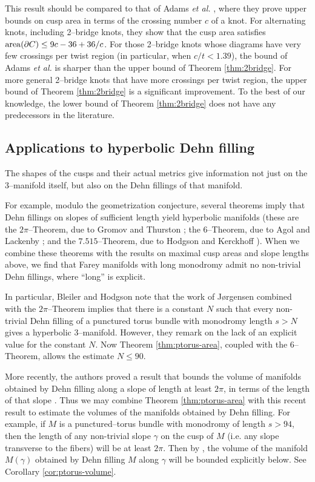 \documentclass[11pt]{amsart}
\newcommand{\area}{{\rm area}}
\newcommand{\bdy}{{\partial}}
\theoremstyle{plain}
\theoremstyle{definition}
\begin{document}
This result should be compared to that of Adams \emph{et al.}
\cite{adams-students:cusp-area}, where they prove upper bounds on cusp
area in terms of the crossing number $c$ of a knot.  For alternating
knots, including 2--bridge knots, they show that the cusp area
satisfies $\area(\bdy C) \leq 9c - 36 + 36/c$.  For those 2--bridge
knots whose diagrams have very few crossings per twist region (in
particular, when $c/t < 1.39$), the bound of Adams \emph{et al.} is
sharper than the upper bound of Theorem \ref{thm:2bridge}.  For more
general 2--bridge knots that have more crossings per twist region, the
upper bound of Theorem \ref{thm:2bridge} is a significant improvement.
To the best of our knowledge, the lower bound of Theorem
\ref{thm:2bridge} does not have any predecessors in the literature.

\subsection{Applications to hyperbolic Dehn filling}

The shapes of the cusps and their actual metrics give information not
just on the 3--manifold itself, but also on the Dehn fillings of that
manifold.

For example, modulo the geometrization conjecture, several theorems
imply that Dehn fillings on slopes of sufficient length yield
hyperbolic manifolds (these are the $2\pi$--Theorem, due to Gromov and
Thurston \cite{bleiler-hodgson}; the 6--Theorem, due to Agol
\cite{agol:bounds} and Lackenby \cite{lackenby:word}; and the
$7.515$--Theorem, due to Hodgson and Kerckhoff \cite{hk:univ}).  When
we combine these theorems with the results on maximal cusp areas and
slope lengths above, we find that Farey manifolds with long monodromy
admit no non-trivial Dehn fillings, where ``long'' is explicit.

In particular, Bleiler and Hodgson \cite{bleiler-hodgson} note that
the work of J{\o}rgensen \cite{jorgensen} combined with the
$2\pi$--Theorem implies that there is a constant $N$ such that every
non-trivial Dehn filling of a punctured torus bundle with monodromy
length $s>N$ gives a hyperbolic 3--manifold.  However, they remark on
the lack of an explicit value for the constant $N$.  Now Theorem
\ref{thm:ptorus-area}, coupled with the 6--Theorem, allows the
estimate $N\leq 90$.

More recently, the authors proved a result that bounds the volume of
manifolds obtained by Dehn filling along a slope of length at least
$2\pi$, in terms of the length of that slope \cite{fkp-07}.  Thus we
may combine Theorem \ref{thm:ptorus-area} with this recent result to
estimate the volumes of the manifolds obtained by Dehn filling.  For
example, if $M$ is a punctured--torus bundle with monodromy of length
$s>94$, then the length of any non-trivial slope $\gamma$ on the cusp
of $M$ (i.e. any slope transverse to the fibers) will be at least
$2\pi$.  Then by \cite[Theorem 1.1]{fkp-07}, the volume of the
manifold $M(\gamma)$ obtained by Dehn filling $M$ along $\gamma$ will
be bounded explicitly below.  See Corollary \ref{cor:ptorus-volume}.
\end{document}
